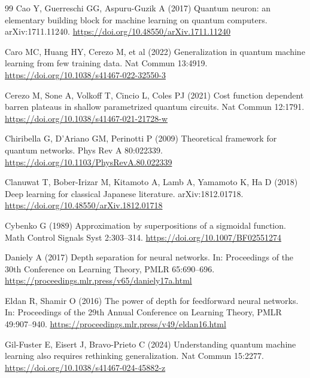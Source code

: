 \documentclass[pdflatex,sn-mathphys,NameDate,iicol]{sn-jnl}
\begin{document}
\begin{thebibliography}{99}
Cao Y, Guerreschi GG, Aspuru-Guzik A (2017) Quantum neuron: an elementary
building block for machine learning on quantum computers.
arXiv:1711.11240. \url{https://doi.org/10.48550/arXiv.1711.11240}

Caro MC, Huang HY, Cerezo M, et al (2022) Generalization in quantum machine
learning from few training data. Nat Commun 13:4919.
\url{https://doi.org/10.1038/s41467-022-32550-3}

Cerezo M, Sone A, Volkoff T, Cincio L, Coles PJ (2021) Cost function
dependent barren plateaus in shallow parametrized quantum circuits.
Nat Commun 12:1791.
\url{https://doi.org/10.1038/s41467-021-21728-w}

Chiribella G, D'Ariano GM, Perinotti P (2009) Theoretical framework for
quantum networks. Phys Rev A 80:022339.
\url{https://doi.org/10.1103/PhysRevA.80.022339}

Clanuwat T, Bober-Irizar M, Kitamoto A, Lamb A, Yamamoto K, Ha D (2018) Deep
learning for classical Japanese literature. arXiv:1812.01718.
\url{https://doi.org/10.48550/arXiv.1812.01718}

Cybenko G (1989) Approximation by superpositions of a sigmoidal function.
Math Control Signals Syst 2:303--314.
\url{https://doi.org/10.1007/BF02551274}

Daniely A (2017) Depth separation for neural networks. In: Proceedings of
the 30th Conference on Learning Theory, PMLR 65:690--696.
\url{https://proceedings.mlr.press/v65/daniely17a.html}

Eldan R, Shamir O (2016) The power of depth for feedforward neural networks.
In: Proceedings of the 29th Annual Conference on Learning Theory, PMLR
49:907--940. \url{https://proceedings.mlr.press/v49/eldan16.html}

Gil-Fuster E, Eisert J, Bravo-Prieto C (2024) Understanding quantum machine
learning also requires rethinking generalization.
Nat Commun 15:2277.
\url{https://doi.org/10.1038/s41467-024-45882-z}


\end{thebibliography}
\end{document}
